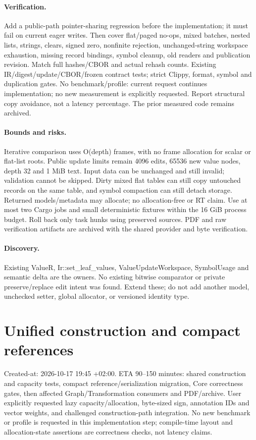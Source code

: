 \documentclass[11pt,a4paper]{article}
\begin{document}
\paragraph{Verification.} Add a public-path pointer-sharing regression before the
implementation; it must fail on current eager writes. Then cover flat/paged no-ops,
mixed batches, nested lists, strings, clears, signed zero, nonfinite rejection,
unchanged-string workspace exhaustion, missing record bindings, symbol cleanup,
old readers and publication revision. Match full hashes/CBOR and actual rehash
counts. Existing IR/digest/update/CBOR/frozen contract tests; strict Clippy, format,
symbol and duplication gates. No benchmark/profile: current request continues
implementation; no new measurement is explicitly requested. Report structural
copy avoidance, not a latency percentage. The prior measured code remains archived.
\paragraph{Bounds and risks.} Iterative comparison uses O(depth) frames, with no
frame allocation for scalar or flat-list roots. Public update limits remain 4096
edits, 65536 new value nodes, depth 32 and 1 MiB text. Input data can be unchanged
and still invalid; validation cannot be skipped. Dirty mixed flat tables can still
copy untouched records on the same table, and symbol compaction can still detach
storage. Returned models/metadata may allocate; no allocation-free or RT claim.
Use at most two Cargo jobs and small deterministic fixtures within the 16 GiB
process budget. Roll back only task hunks using preserved sources. PDF and raw
verification artifacts are archived with the shared provider and byte verification.
\paragraph{Discovery.} Existing ValueR, Ir::set\_leaf\_values, ValueUpdateWorkspace,
SymbolUsage and semantic delta are the owners. No existing bitwise comparator or
private preserve/replace edit intent was found. Extend these; do not add another
model, unchecked setter, global allocator, or versioned identity type.


\newpage\section*{Unified construction and compact references}
Created-at: 2026-10-17 19:45 +02:00. ETA 90--150 minutes: shared construction and
capacity tests, compact reference/serialization migration, Core correctness gates,
then affected Graph/Transformation consumers and PDF/archive. User explicitly
requested lazy capacity/allocation, byte-sized sign, annotation IDs and vector
weights, and challenged construction-path integration. No new benchmark or profile
is requested in this implementation step; compile-time layout and allocation-state
assertions are correctness checks, not latency claims.
\end{document}
